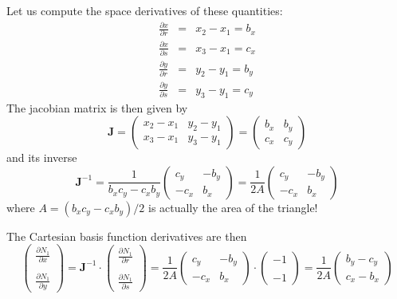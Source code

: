 Let us compute the space derivatives of these quantities:
\begin{eqnarray}
\frac{\partial x}{\partial r} &=& x_2-x_1=b_x \nonumber\\
\frac{\partial x}{\partial s} &=& x_3-x_1=c_x \nonumber\\
\frac{\partial y}{\partial r} &=& y_2-y_1=b_y \nonumber\\
\frac{\partial y}{\partial s} &=& y_3-y_1=c_y \nonumber
\end{eqnarray}
The jacobian matrix is then given by
\[
{\bm J} = \left(
\begin{array}{cc}
x_2-x_1 & y_2-y_1 \\
x_3-x_1 & y_3-y_1
\end{array}
\right)
= \left(
\begin{array}{cc}
b_x & b_y \\
c_x & c_y
\end{array}
\right)
\]
and its inverse
\[
{\bm J}^{-1} 
= \frac{1}{b_xc_y-c_xb_y}
\left(
\begin{array}{cc}
c_y& -b_y \\
-c_x & b_x
\end{array}
\right)
=
\frac{1}{2A}
\left(
\begin{array}{cc}
c_y& -b_y \\
-c_x & b_x
\end{array}
\right)
\]
where $A=(b_xc_y-c_xb_y)/2$ is actually the area of the triangle!


The Cartesian basis function derivatives are then
\[
\left(
\begin{array}{c}
\frac{\partial N_1}{\partial x} \\ \\
\frac{\partial N_1}{\partial y}
\end{array}
\right)
=
{\bm J}^{-1}
\cdot
\left(
\begin{array}{c}
\frac{\partial N_1}{\partial r} \\ \\
\frac{\partial N_1}{\partial s}
\end{array}
\right)
=
\frac{1}{2A}
\left(
\begin{array}{cc}
c_y& -b_y \\
-c_x & b_x
\end{array}
\right)
\cdot
\left(
\begin{array}{c}
-1 \\ \\ -1 
\end{array}
\right)
=
\frac{1}{2A} 
\left(
\begin{array}{c}
b_y - c_y \\ 
c_x - b_x
\end{array}
\right)
\]


